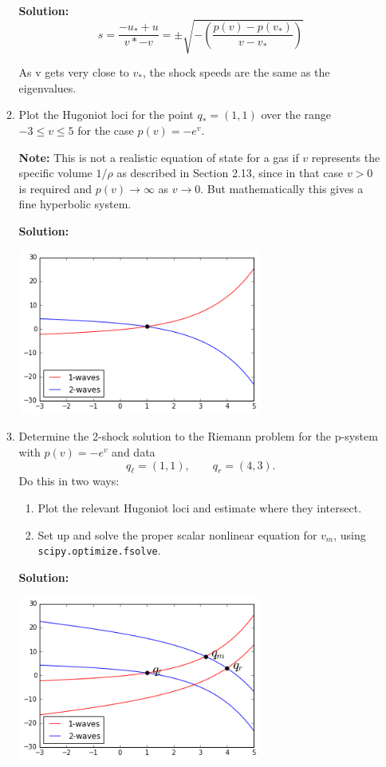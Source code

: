 \documentclass[11pt]{article}
\begin{document}
\begin{enumerate}
\begin{enumerate}
\vskip 1cm
{\bf Solution:}
\[ s= \frac{-u_*+u}{v*-v}=\pm \sqrt{-\left( \frac{p(v)-p(v_*)}{v-v_*} \right)}\]

As v gets very close to $v_*$, the shock speeds are the same as the eigenvalues.
\item Plot the Hugoniot loci for the point $q_* = (1,1)$ over the range
$-3\leq v \leq 5$ for the case $p(v) = -e^v$.

{\bf Note:} This is not a realistic equation of state for a gas if $v$
represents the specific volume $1/\rho$ as described in Section 2.13, since
in that case $v>0$ is required and $p(v) \rightarrow \infty$ as
$v\rightarrow 0$.  But mathematically this gives a fine hyperbolic system.

\vskip 1cm
{\bf Solution:}


	\begin{minipage}{\linewidth}
		\centering
	\includegraphics[width=8cm]{d.png}
	\end{minipage}

\item Determine the 2-shock solution to the Riemann problem for the p-system
with $p(v) = -e^v$ and data
\[
q_\ell = (1,1), \qquad q_r = (4,3).
\]
Do this in two ways:
 \begin{enumerate} 
 \item Plot the relevant Hugoniot loci and estimate where they intersect.
 \item Set up and solve the proper scalar nonlinear equation for $v_m$, 
 using \verb+scipy.optimize.fsolve+.
 \end{enumerate} 
\vskip 1cm
{\bf Solution:}


\begin{minipage}{\linewidth}
	\centering
	\includegraphics[width=8cm]{e.png}
\end{minipage}


\end{enumerate}
\end{enumerate}
\end{document}
